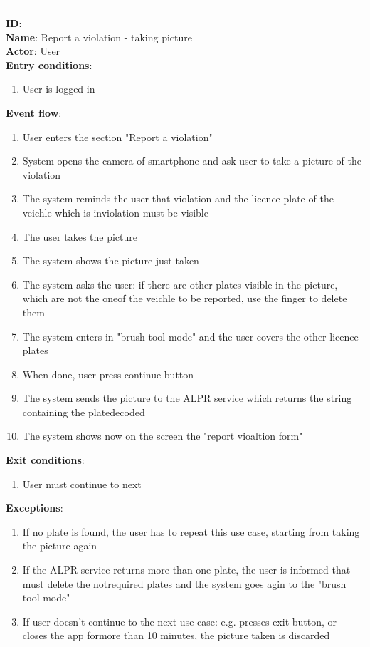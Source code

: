 	\rule{\linewidth}{0.4pt}
  \textbf{ID}:  \\
  \textbf{Name}: Report a violation - taking picture \\
  \textbf{Actor}: User   \\
  \textbf{Entry conditions}:
  \begin{enumerate}
    \item{User is logged in}
  \end{enumerate}
  \textbf{Event flow}:
  \begin{enumerate}
    \item{User enters the section "Report a violation"}
    \item{System opens the camera of smartphone and ask user to take a picture of the violation}
    \item{The system reminds the user that violation and the licence plate of the veichle which is inviolation must be visible }
    \item{The user takes the picture }
    \item{The system shows the picture just taken }
    \item{The system asks the user: if there are other plates visible in the picture, which are not the oneof the veichle to be reported, use the finger to delete them }
    \item{The system enters in "brush tool mode" and the user covers the other licence plates}
    \item{When done, user press continue button}
    \item{The system sends the picture to the ALPR service which returns the string containing the platedecoded}
    \item{The system shows now on the screen the "report vioaltion form"}
  \end{enumerate}
  \textbf{Exit conditions}:
  \begin{enumerate}
    \item{User must continue to next }
  \end{enumerate}
  \textbf{Exceptions}:
  \begin{enumerate}
    \item{If no plate is found, the user has to repeat this use case, starting from taking the picture again}
    \item{If the ALPR service returns more than one plate, the user is informed that must delete the notrequired plates and the system goes agin to the "brush tool mode"}
    \item{If user doesn't continue to the next use case: e.g. presses exit button, or closes the app formore than 10 minutes, the picture taken is discarded}
  \end{enumerate}
